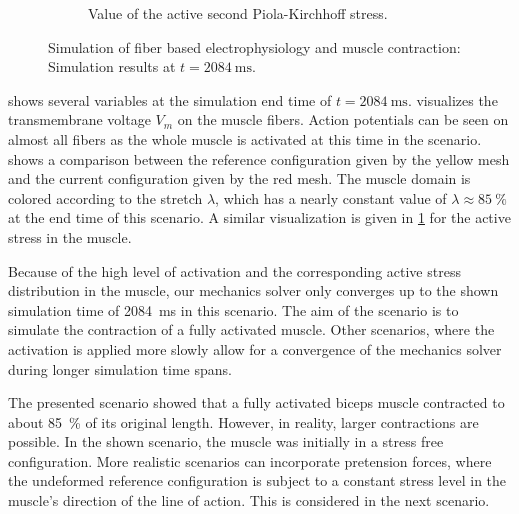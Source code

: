 \begin{figure}
\begin{subfigure}[t]{0.31\textwidth}
    \caption{Value of the active second Piola-Kirchhoff stress.}%
    \label{fig:contraction_active_stress}%
  \end{subfigure}
  \caption{Simulation of fiber based electrophysiology and muscle contraction: Simulation results at $t=\SI{2084}{\ms}$.}%
  \label{fig:contraction_at_end}%
\end{figure}%

 shows several variables at the simulation end time of $t=\SI{2084}{\ms}$.  visualizes the transmembrane voltage $V_m$ on the muscle fibers. Action potentials can be seen on almost all fibers as the whole muscle is activated at this time in the scenario.  shows a comparison between the reference configuration given by the yellow mesh and the current configuration given by the red mesh. The muscle domain is colored according to the stretch $\lambda$, which has a nearly constant value of $\lambda \approx \SI{85}{\percent}$ at the end time of this scenario. A similar visualization is given in \cref{fig:contraction_active_stress} for the active stress in the muscle.

Because of the high level of activation and the corresponding active stress distribution in the muscle, our mechanics solver only converges up to the shown simulation time of \SI{2084}{\ms} in this scenario. The aim of the scenario is to simulate the contraction of a fully activated muscle. Other scenarios, where the activation is applied more slowly allow for a convergence of the mechanics solver during longer simulation time spans.

The presented scenario showed that a fully activated biceps muscle contracted to about \SI{85}{\percent} of its original length. However, in reality, larger contractions are possible. In the shown scenario, the muscle was initially in a stress free configuration. More realistic scenarios can incorporate pretension forces, where the undeformed reference configuration is subject to a constant stress level in the muscle's direction of the line of action. This is considered in the next scenario.


